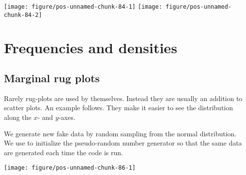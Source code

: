 \documentclass[paper=a4,10pt,div=17,headsepline,BCOR=12mm,twoside,open=right]{scrbook}\usepackage{knitr}
\begin{document}
\begin{knitrout}
{\centering \texttt{[image: figure/pos-unnamed-chunk-84-1]} 
\texttt{[image: figure/pos-unnamed-chunk-84-2]} 

}



\end{knitrout}

\section{Frequencies and densities}

\subsection{Marginal rug plots}

Rarely rug-plots are used by themselves. Instead they are usually an addition to
scatter plots. An example follows. They make it easier to see the distribution
along the $x$- and $y$-axes.

We generate new fake data by random sampling from the normal distribution. We use  to initialize the pseudo-random number generator so that
the same data are generated each time the code is run.

\begin{knitrout}\footnotesize
{}\color{fgcolor}\begin{kframe}
\begin{alltt}
\hlstd{(}\hlstd{)}
 \hlkwb{<-}
  \hlstd{(} \hlstd{=} \hlstd{(}\hlstd{),}
              \hlstd{=} \hlstd{(}\hlstd{(}\hlstd{,} \hlopt{-}\hlstd{,} \hlstd{),} \hlstd{(}\hlstd{,} \hlstd{,} \hlstd{)),}
              \hlstd{=} \hlstd{(}\hlstd{(}\hlstd{(}\hlstd{,} \hlstd{),} \hlstd{(}\hlstd{,} \hlstd{))) )}
\end{alltt}
\end{kframe}
\end{knitrout}

\begin{knitrout}\footnotesize
{}\color{fgcolor}\begin{kframe}
\begin{alltt}
    \hlopt{+}
  \hlstd{()} \hlopt{+}
  \hlstd{()}
\end{alltt}
\end{kframe}

{\centering \texttt{[image: figure/pos-unnamed-chunk-86-1]} 

}



\end{knitrout}
\end{document}
